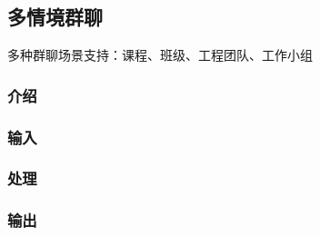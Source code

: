 \subsection{多情境群聊}
多种群聊场景支持：课程、班级、工程团队、工作小组
\subsubsection{介绍}
\subsubsection{输入}
\subsubsection{处理}
\subsubsection{输出}